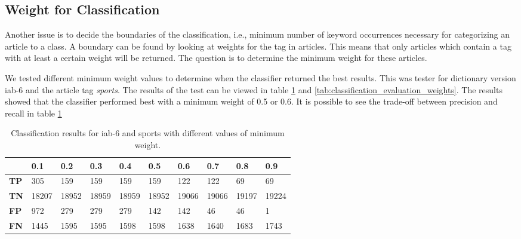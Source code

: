 \subsection{Weight for Classification}
Another issue is to decide the boundaries of the classification, i.e., minimum number of keyword occurrences necessary for categorizing an article to a class. A boundary can be found by looking at weights for the tag in articles. This means that only articles which contain a tag with at least a certain weight will be returned. The question is to determine the minimum weight for these articles. 

We tested different minimum weight values to determine when the classifier returned the best results. This was tester  for dictionary version iab-6 and the article tag \emph{sports}. The results of the test can be viewed in table \ref{tab:classification_results_weights} and \ref{tab:classification_evaluation_weights}. The results showed that the classifier performed best with a minimum weight of 0.5 or 0.6. It is possible to see the trade-off between precision and recall in table \ref{tab:classification_results_weights}

\begin{table}[h]
\centering
\renewcommand{\arraystretch}{1.25}
\begin{tabularx}{\textwidth}{l |X|X|X|X|X|X|X|X|X}
         & {\bf 0.1} & {\bf 0.2} & {\bf 0.3} & {\bf 0.4} & {\bf 0.5} & {\bf 0.6} & {\bf 0.7} & {\bf 0.8} & {\bf 0.9} \\ \hline
{\bf TP} & 305       & 159       & 159       & 159       & 159       & 122       & 122       & 69        & 69        \\ \hline
{\bf TN} & 18207     & 18952     & 18959     & 18959     & 18952     & 19066     & 19066     & 19197     & 19224     \\ \hline
{\bf FP} & 972       & 279       & 279       & 279       & 142       & 142       & 46        & 46        & 1         \\ \hline
{\bf FN} & 1445      & 1595      & 1595      & 1598      & 1598      & 1638      & 1640      & 1683      & 1743    
\end{tabularx}
\caption[Classification results for different minimum weights.]{Classification results for iab-6 and sports with different values of minimum weight.}
\label{tab:classification_results_weights}
\end{table}



